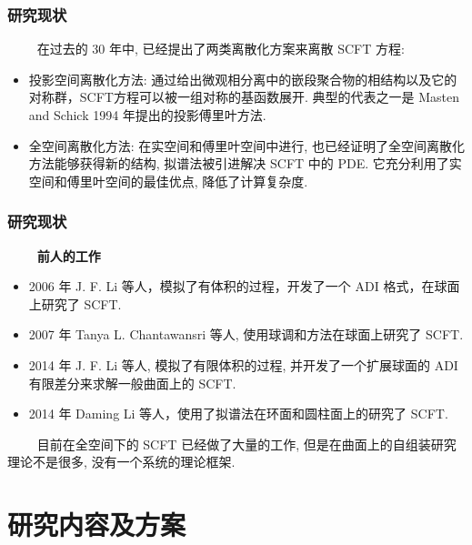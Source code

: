 \documentclass[notheorems,serif]{beamer}
\begin{document}
\begin{frame}
    \frametitle{研究现状}

~~~~ 在过去的 30 年中, 已经提出了两类离散化方案来离散 SCFT 方程:
    \begin{itemize}
        \item 投影空间离散化方法:
            通过给出微观相分离中的嵌段聚合物的相结构以及它的对称群，SCFT方程可以被一组对称的基函数展开. 典型的代表之一是
            Masten and Schick 1994  年提出的投影傅里叶方法. 

        \item 全空间离散化方法: 在实空间和傅里叶空间中进行, 也已经证明了全空间离散化方法能够获得新的结构, 拟谱法被引进解决 SCFT 中的 PDE. 
            它充分利用了实空间和傅里叶空间的最佳优点, 降低了计算复杂度.
    \end{itemize}

    
\end{frame}

\begin{frame}
    \frametitle{研究现状}
    ~~~~ \textbf{前人的工作}
    \begin{itemize}
        \item 2006 年 J. F. Li 等人，模拟了有体积的过程，开发了一个 ADI 格式，在球面上研究了 SCFT.
        \item 2007 年 Tanya L. Chantawansri 等人, 使用球调和方法在球面上研究了 SCFT.
        \item 2014 年 J. F. Li 等人, 模拟了有限体积的过程, 并开发了一个扩展球面的 ADI 有限差分来求解一般曲面上的 SCFT.
        \item 2014 年 Daming Li 等人，使用了拟谱法在环面和圆柱面上的研究了 SCFT.
    \end{itemize}
~~~~ 目前在全空间下的 SCFT 已经做了大量的工作, 但是在曲面上的自组装研究理论不是很多, 没有一个系统的理论框架.
\end{frame}
\section{研究内容及方案}
\end{document}
